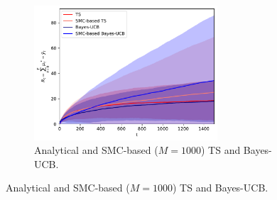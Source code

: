 \begin{figure}[!h]
	\centering
	\begin{subfigure}[b]{\textwidth}
		\centering
		\includegraphics[width=0.75\textwidth]{./fods_figs/static/bernoulli/A5/theta0.5_0.6_0.7_0.8_0.9_M1000_cumulative_regret}
		\caption{Analytical and SMC-based ($M=1000$) TS and Bayes-UCB.}
	\end{subfigure}
	

\end{figure}

